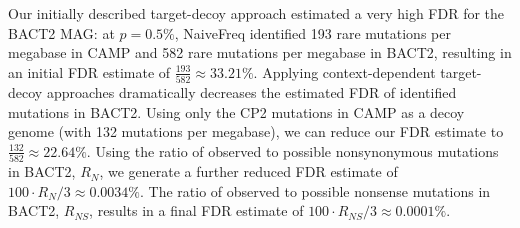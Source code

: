 Our initially described target-decoy approach estimated a very high FDR for the BACT2 MAG:
at $p = 0.5\%$, NaiveFreq identified 193 rare mutations per megabase in CAMP and 582 rare mutations per megabase in BACT2, resulting in an initial FDR estimate of $\frac{193}{582} \approx 33.21\%$.
Applying context-dependent target-decoy approaches dramatically decreases the estimated FDR of identified mutations in BACT2.
Using only the CP2 mutations in CAMP as a decoy genome (with 132 mutations per megabase), we can reduce our FDR estimate to $\frac{132}{582} \approx 22.64\%$.
Using the ratio of observed to possible nonsynonymous mutations in BACT2, $R_N$, we generate a further reduced FDR estimate of $100 \cdot R_N / 3 \approx 0.0034\%$.
The ratio of observed to possible nonsense mutations in BACT2, $R_{NS}$, results in a final FDR estimate of $100 \cdot R_{NS} / 3 \approx 0.0001\%$.\endinput